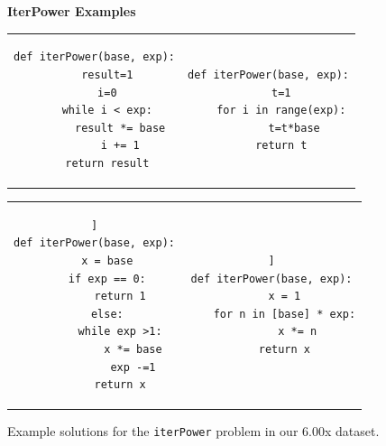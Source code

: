 \documentclass[12pt,twoside]{mitthesis}
\newcommand \codevar[1]{\texttt{#1}}
\begin{document}
\begin{figure}
{\bf IterPower Examples} \\
\begin{tabular}{cc} 
\begin{minipage}{0.4\linewidth}
\begin{lstlisting}[]
def iterPower(base, exp):
    result=1
    i=0
    while i < exp:
        result *= base
        i += 1
    return result
\end{lstlisting}
\end{minipage}
&
\begin{minipage}{0.4\linewidth}
\begin{lstlisting}[]
def iterPower(base, exp):
    t=1
    for i in range(exp):
        t=t*base
    return t
\end{lstlisting}
\end{minipage}
\\
\end{tabular}

\begin{tabular}{c c}
\begin{minipage}{0.4\linewidth}
\begin{lstlisting}]
def iterPower(base, exp):
    x = base
    if exp == 0:
        return 1
    else:
        while exp >1:
            x *= base
            exp -=1
        return x
\end{lstlisting}
\end{minipage}
&
\begin{minipage}{0.4\linewidth}
\begin{lstlisting}]
def iterPower(base, exp):
    x = 1
    for n in [base] * exp:
        x *= n
    return x
\end{lstlisting}
\end{minipage}

\end{tabular}
\caption{Example solutions for the \codevar{iterPower} problem in our 6.00x dataset.}
\label{ipexamples}
\end{figure}
\end{document}
